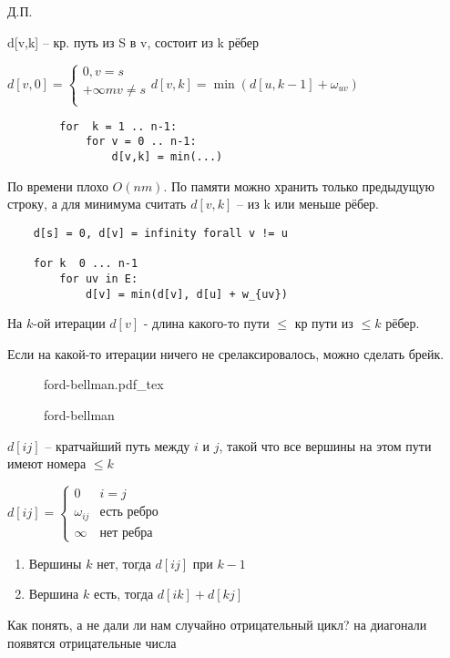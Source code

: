 \documentclass{book}
\theoremstyle{definition}
\newcommand{\incfig}[1]{%
    \def\svgwidth{\columnwidth}
    {#1.pdf_tex}
}
\begin{document}
\begin{statement}

    Д.П.

    d[v,k] -- кр. путь из S в v, состоит из k рёбер

    $d[v,0] = \begin{cases}
        0, v=s\\
        +\infty m v\neq s\\
    \end{cases}
    d[v,k] = \min\left( d[u, k-1] + \omega_{uv} \right) $

    \begin{lstlisting}
        for  k = 1 .. n-1:
            for v = 0 .. n-1:
                d[v,k] = min(...)
    \end{lstlisting}



По времени плохо $O(nm)$. По памяти можно хранить только предыдущую строку, а для минимума считать  $d[v,k]$ -- из k или меньше рёбер.

 \begin{lstlisting}
    d[s] = 0, d[v] = infinity forall v != u

    for k  0 ... n-1
        for uv in E:
            d[v] = min(d[v], d[u] + w_{uv})
\end{lstlisting}

На $k$-ой итерации  $d[v]$ - длина какого-то пути  $\leqslant $ кр пути из $\leqslant k$ рёбер.

Если на какой-то итерации ничего не срелаксировалось, можно сделать брейк.
\end{statement}

\begin{figure}[!ht]
    \centering
    \incfig{ford-bellman}
    \caption{ford-bellman}
    \label{fig:ford-bellman}
\end{figure}

\begin{statement}
    $d[ij]$ -- кратчайший путь между  $i$ и $j$, такой что все вершины на этом пути имеют номера  $\leqslant k$

    $d[ij] = \begin{cases}
        0& i = j\\
        \omega_{ij} & \text{есть ребро}\\
        \infty  & \text{нет ребра}
    \end{cases}$ 

    \begin{enumerate}
        \item Вершины $k$ нет, тогда  $d[ij]$ при  $k-1$
        \item Вершина  $k$ есть, тогда  $d[ik] + d[kj]$
    \end{enumerate}

    Как понять, а не дали ли нам случайно отрицательный цикл? на диагонали появятся отрицательные числа
\end{statement}
\end{document}
